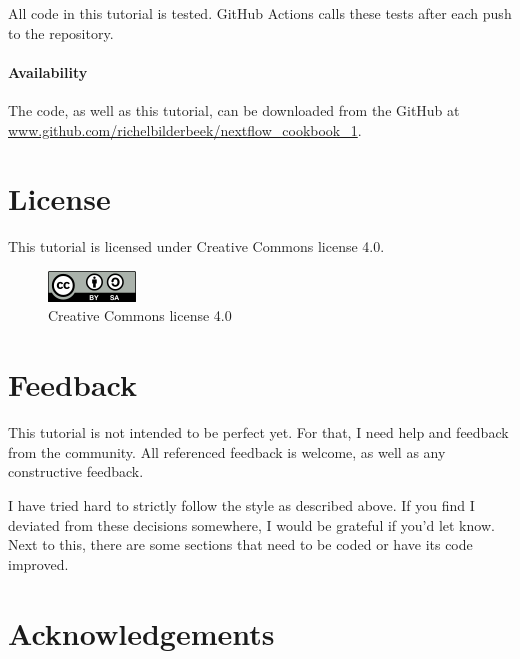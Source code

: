 All code in this tutorial is tested.
GitHub Actions calls these tests after each push to the repository.

\paragraph{Availability}

The code, as well as this tutorial, can be downloaded from the GitHub at
\url{www.github.com/richelbilderbeek/nextflow_cookbook_1}.

\section{License}

This tutorial is licensed under Creative Commons license 4.0.

\begin{figure}[!htbp]
  \includegraphics[]{CC-BY-SA_icon.png}
  \caption{
    Creative Commons license 4.0
  }
  \label{fig:license}
\end{figure}

\section{Feedback}

This tutorial is not intended to be perfect yet.
For that, I need help and feedback from the community.
All referenced feedback is welcome, as well as any constructive feedback.

I have tried hard to strictly follow the style as described above.
If you find I deviated from these decisions somewhere, I would be grateful
if you'd let know.
Next to this, there are some sections that need to be coded or have its
code improved.

\section{Acknowledgements}

